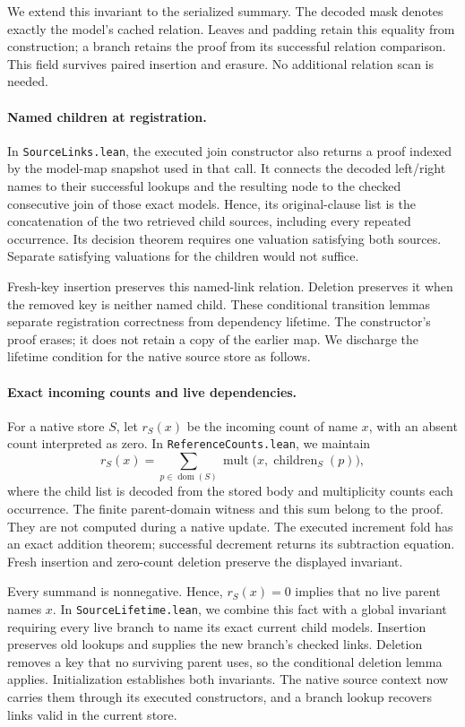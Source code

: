 \documentclass[11pt,a4paper]{article}
\numberwithin{equation}{section}
\theoremstyle{plain}
\theoremstyle{definition}
\theoremstyle{remark}
\begin{document}
We extend this invariant to the serialized summary. The decoded mask denotes exactly the model's cached relation. Leaves and padding retain this equality from construction; a branch retains the proof from its successful relation comparison. This field survives paired insertion and erasure. No additional relation scan is needed.

\paragraph{Named children at registration.}
In \texttt{SourceLinks.lean}, the executed join constructor also returns a proof indexed by the model-map snapshot used in that call. It connects the decoded left/right names to their successful lookups and the resulting node to the checked consecutive join of those exact models. Hence, its original-clause list is the concatenation of the two retrieved child sources, including every repeated occurrence. Its decision theorem requires one valuation satisfying both sources. Separate satisfying valuations for the children would not suffice.

Fresh-key insertion preserves this named-link relation. Deletion preserves it when the removed key is neither named child. These conditional transition lemmas separate registration correctness from dependency lifetime. The constructor's proof erases; it does not retain a copy of the earlier map. We discharge the lifetime condition for the native source store as follows.

\paragraph{Exact incoming counts and live dependencies.}
For a native store $S$, let $r_S(x)$ be the incoming count of name $x$, with an absent count interpreted as zero. In \texttt{ReferenceCounts.lean}, we maintain
\[
r_S(x)=\sum_{p\in\operatorname{dom}(S)}
\operatorname{mult}\bigl(x,\operatorname{children}_S(p)\bigr),
\]
where the child list is decoded from the stored body and multiplicity counts each occurrence. The finite parent-domain witness and this sum belong to the proof. They are not computed during a native update. The executed increment fold has an exact addition theorem; successful decrement returns its subtraction equation. Fresh insertion and zero-count deletion preserve the displayed invariant.

Every summand is nonnegative. Hence, $r_S(x)=0$ implies that no live parent names $x$. In \texttt{SourceLifetime.lean}, we combine this fact with a global invariant requiring every live branch to name its exact current child models. Insertion preserves old lookups and supplies the new branch's checked links. Deletion removes a key that no surviving parent uses, so the conditional deletion lemma applies. Initialization establishes both invariants. The native source context now carries them through its executed constructors, and a branch lookup recovers links valid in the current store.
\end{document}
